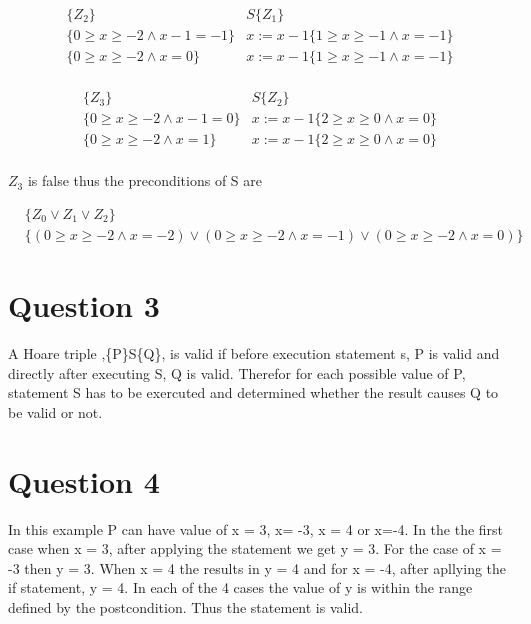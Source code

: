\documentclass[10pt,a4paper]{article}
\begin{document}
\begin{equation}
\begin{split}
 \{Z_2\}&S\{Z_1\}\\
  \{  0 \geq x \geq -2\wedge x-1=-1\}&x:=x-1\{ 1 \geq x \geq -1\wedge x=-1\}\\
    \{  0 \geq x \geq -2\wedge x=0\}&x:=x-1\{ 1 \geq x \geq -1\wedge x=-1\}\\
\end{split}
  \end{equation} 

  
\begin{equation}
\begin{split}
 \{Z_3\}&S\{Z_2\}\\
  \{  0 \geq x \geq -2\wedge x-1=0\}&x:=x-1 \{ 2 \geq x \geq 0\wedge x=0\}\\
    \{ 0 \geq x \geq -2\wedge x=1\}&x:=x-1 \{ 2 \geq x \geq 0\wedge x=0\}\\
\end{split}
  \end{equation} 


$Z_3$ is false thus the preconditions of S are

\begin{equation}
\begin{split}
 &\{Z_0 \vee Z_1 \vee Z_2\}\\
 &\{(0 \geq x \geq -2\wedge x=-2)\vee (0 \geq x \geq -2\wedge x=-1)\vee( 0 \geq x \geq -2\wedge x=0)\}
 \end{split}
\end{equation}

\section{Question 3}

A Hoare triple ,\{P\}S\{Q\}, is valid if before execution statement s, P is valid and directly after executing S, Q is valid. Therefor for each possible value of P, statement S has to be exercuted and determined whether the result causes Q to be valid or not.  

\section{Question 4}

In this example P can have value of  x = 3, x= -3, x = 4 or x=-4. In the the first case when x = 3, after applying the statement we get y = 3. For the case of x = -3 then y = 3. When x = 4 the results in y = 4 and for x = -4, after apllying the if statement, y = 4. In each of the 4 cases the value of y is within the range defined by the postcondition. Thus the statement is valid.   
\end{document}
